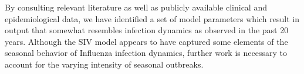 \documentclass[12pt]{article}
\begin{document}
By consulting relevant literature as well as publicly available clinical and epidemiological data, we have identified a set of model parameters which result in output that somewhat resembles infection dynamics as observed in the past 20 years. Although the SIV model appears to have captured some elements of the seasonal behavior of Influenza infection dynamics, further work is necessary to account for the varying intensity of seasonal outbreaks.


\bigskip




\end{document}
